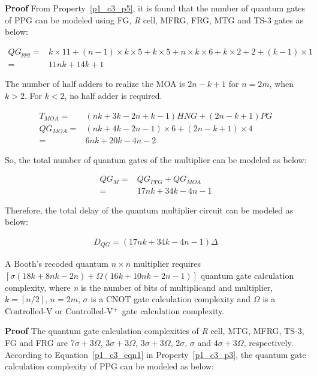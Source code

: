 \noindent\textbf{Proof}
	From Property~\ref{p1_c3_p5}, it is found that the number of quantum gates of PPG can be modeled using FG, \textit{R} cell, MFRG, FRG, MTG and TS-3 gates as below:

\begin{align*}
QG_{ppg} =& k\times 11 + (n-1) \times k\times 5 + k\times 5 + n\times k\times 6 + k\times 2 + 2 + (k-1)\times 1\\	
=&11nk + 14k + 1
\end{align*}

\noindent The number of half adders to realize the MOA is $2n-k+1$ for $n=2m$, when $k>2$. For $k<2$, no half adder is required. 

\begin{align*}
	T_{MOA}=&(nk + 3k - 2n + k - 1)HNG + (2n - k + 1) PG\\	
	QG_{MOA}=& (nk + 4k - 2n - 1)\times 6+(2n - k + 1)\times 4\\	
	=& 6nk + 20k - 4n - 2
\end{align*}

\noindent So, the total number of quantum gates of the multiplier can be modeled as below:

\begin{align*}
	QG_{M} =& QG_{PPG} + QG_{MOA}\\
	=& 17nk + 34k - 4n - 1
\end{align*}

\noindent Therefore, the total delay of the quantum multiplier circuit can be modeled as below:

\begin{align*}
	D_{QG}= (17nk + 34k - 4n - 1) \Delta
\end{align*}

\begin{property}\textnormal{
	A Booth's recoded quantum $n\times n$ multiplier requires $[\sigma (18k + 8nk - 2n) + \Omega (16k + 10nk - 2n - 1) ]$ quantum gate calculation complexity, where \textit{n} is the number of bits of multiplicand and multiplier, $k = \left\lceil n/2\right\rceil $, $n=2m$, $\sigma$ is a CNOT gate calculation complexity and $\Omega$ is a Controlled-V or Controlled-V${}^{+\ }$ gate calculation complexity.}
\end{property}

\noindent\textbf{Proof}	
	The quantum gate calculation complexities of \textit{R} cell, MTG, MFRG, TS-3, FG and FRG are $7\sigma+3\Omega$, $3\sigma+3\Omega$, $3\sigma+3\Omega$, $2\sigma$, $\sigma$ and $4\sigma+3\Omega$, respectively. According to Equation~\ref{p1_c3_eqn1} in Property~\ref{p1_c3_p3}, the quantum gate calculation complexity of PPG can be modeled as below:


